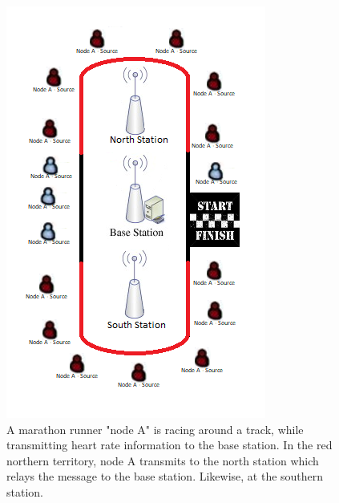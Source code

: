 \begin{figure}[h]
	\centering
	\includegraphics[width=\linewidth]{introduction/scenario/fig/scenarioIntroduction.png}
	\caption{A marathon runner "node A" is racing around a track, while transmitting heart rate information to the base station. In the red northern territory, node A transmits to the north station which relays the message to the base station. Likewise, at the southern station.}
	\label{fig:scenarioIntroduction}
\end{figure}